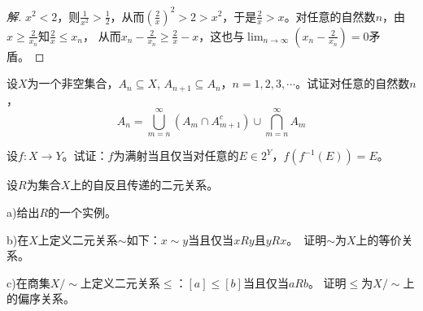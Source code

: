 \documentclass{beamer}
\begin{document}
\begin{CJK*}{UTF8}{gbsn}
\begin{frame}[t]
\begin{proof}[解]
    $x^2<2$，则$\frac{1}{x^2}>\frac{1}{2}$，从而$(\frac{2}{x})^2>2>x^2$，于是$\frac{2}{x}>x$。对任意的自然数$n$，由$x\geq \frac{2}{x_n}$知$\frac{2}{x}\leq x_n$，
    从而$x_n-\frac{2}{x_n}\geq \frac{2}{x}-x$，这也与$\lim_{n\to\infty}(x_n-\frac{2}{x_n})=0$矛盾。    
\end{proof}
\end{frame}


\begin{frame}
  \begin{Exercise}[P20-5]
    设$X$为一个非空集合，$A_n\subseteq X$, $A_{n+1}\subseteq A_n$，$n=1,2,3,\cdots$。试证对任意的自然数$n$，
    \[A_n=\bigcup_{m=n}^{\infty}(A_m\cap A_{m+1}^c)\cup \bigcap_{m=n}^{\infty}A_m\]
  \end{Exercise}
\end{frame}
\begin{frame}
  \begin{Exercise}[P47-5]
    设$f:X\to Y$。试证：$f$为满射当且仅当对任意的$E\in 2^Y$，$f(f^{-1}(E))=E$。
  \end{Exercise}
\end{frame}
\begin{frame}
  \begin{Exercise}[P126-6]
    设$R$为集合$X$上的自反且传递的二元关系。

    a)给出$R$的一个实例。

    b)在$X$上定义二元关系$\sim$如下：$x\sim y$当且仅当$x R y$且$y R x$。　证明$\sim$为$X$上的等价关系。

    c)在商集$X/\sim$上定义二元关系$\leq$：$[a]\leq [b]$当且仅当$aRb$。
    证明$\leq$为$X/\sim$上的偏序关系。
  \end{Exercise}
\end{frame}
\end{CJK*}
\end{document}

